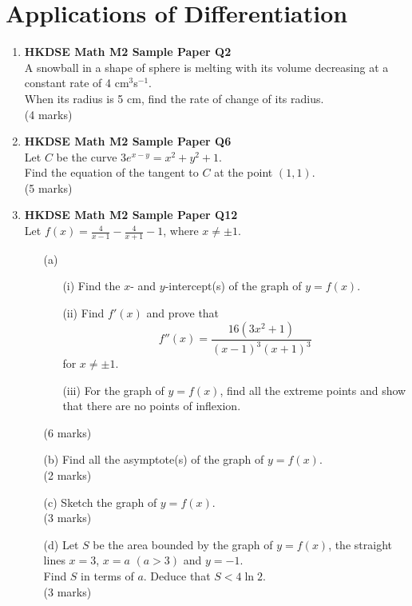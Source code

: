 \documentclass{report}
\begin{document}
\chapter{Applications of Differentiation}
\begin{enumerate}
	\item \textbf{HKDSE Math M2 Sample Paper Q2}\\
	A snowball in a shape of sphere is melting with its volume decreasing at a constant rate of 4 cm$^3$s$^{-1}$. \\
	When its radius is 5 cm, find the rate of change of its radius. \\(4 marks)

	\item \textbf{HKDSE Math M2 Sample Paper Q6}\\
	Let $C$ be the curve $3e^{x-y} = x^2+y^2+1$. \\
	Find the equation of the tangent to $C$ at the point $(1,1)$. \\(5 marks)

	\item \textbf{HKDSE Math M2 Sample Paper Q12}\\
	Let $\displaystyle f(x) = \frac{4}{x-1} - \frac{4}{x+1} -1$, where $x \neq \pm 1$.
	\begin{enumerate}
		\item [(a)]
		\begin{enumerate}
			\item [(i)]Find the $x$- and $y$-intercept(s) of the graph of $y = f(x)$. 
			\item [(ii)]Find $f'(x)$ and prove that 
			$$f''(x) = \displaystyle\frac{16(3x^2 + 1)}{(x-1)^3(x+1)^3}$$
			for $x \neq \pm 1$. 
			\item [(iii)]For the graph of $y = f(x)$, find all the extreme points and show that there are no points of inflexion.
		\end{enumerate}
		(6 marks)
		\item [(b)]Find all the asymptote(s) of the graph of $y = f(x)$. \\(2 marks)
		\item [(c)]Sketch the graph of $y = f(x)$. \\(3 marks)
		\item [(d)]Let $S$ be the area bounded by the graph of $y = f(x)$, the straight lines $x = 3$, $x = a $ $(a > 3)$ and $y = -1$. \\
		Find $S$ in terms of $a$. Deduce that $S < 4\ln{2}$. \\(3 marks)
  	\end{enumerate}
	

\end{enumerate}
\end{document}
